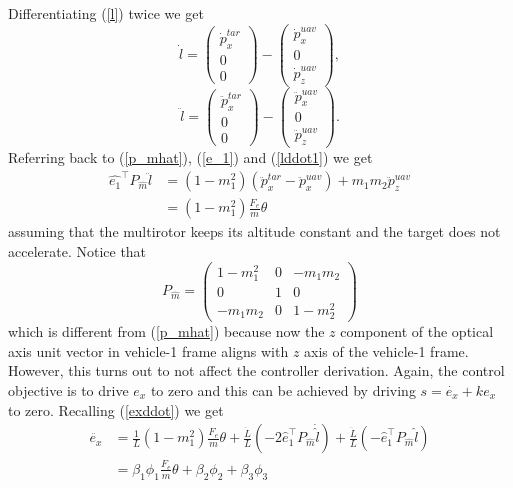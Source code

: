 Differentiating (\ref{l}) twice we get
\begin{equation}
\dot{l}=\begin{pmatrix}
\dot{p}_x^{tar} \\ 0 \\ 0
\end{pmatrix}
-\begin{pmatrix}
\dot{p}_x^{uav} \\ 0 \\ \dot{p}_z^{uav}
\end{pmatrix},
\label{ldot}
\end{equation}
\begin{equation}
\ddot{l}=\begin{pmatrix}
\ddot{p}_x^{tar} \\ 0 \\ 0
\end{pmatrix}
-\begin{pmatrix}
\ddot{p}_x^{uav} \\ 0 \\ \ddot{p}_z^{uav}
\end{pmatrix}.
\label{lddot1}
\end{equation}
Referring back to (\ref{p_mhat}), (\ref{e_1}) and (\ref{lddot1}) we get 
\begin{align}
\hat{e_1}^{\top}P_{\hat{m}}\ddot{l}&=(1-m_1^2)(\ddot{p}_x^{tar}-\ddot{p}_x^{uav})+m_1m_2\ddot{p}_z^{uav}
\\&=(1-m_1^2)\frac{F_e}{m}\theta
\end{align}
assuming that the multirotor keeps its altitude constant and the target does not accelerate. Notice that 
\begin{equation}
P_{\hat{m}}=\begin{pmatrix}1-m_1^2 & 0 & -m_1m_2 \\ 0 & 1 & 0 \\ -m_1m_2 & 0 & 1-m_2^2 \end{pmatrix}
\end{equation}
which is different from (\ref{p_mhat}) because now the $z$ component of the optical axis unit vector in vehicle-1 frame aligns with $z$ axis of the vehicle-1 frame. However, this turns out to not affect the controller derivation.  Again, the control objective is to drive $e_x$ to zero and this can be achieved by driving $s=\dot{e_x}+ke_x$ to zero.
Recalling (\ref{exddot}) we get
\begin{align}
\ddot{e_x}&=\frac{1}{L}(1-m_1^2)\frac{F_e}{m}\theta+\frac{\dot{L}}{L}(-2\hat{e}_1^{\top}P_{\hat{m}}\dot{\hat{l}})+\frac{\ddot{L}}{L}(-\hat{e}_1^{\top}P_{\hat{m}}\hat{l})
\\&=\beta_1\phi_1\frac{F_e}{m}\theta+\beta_2\phi_2+\beta_3\phi_3
\label{exddot1}
\end{align} 
